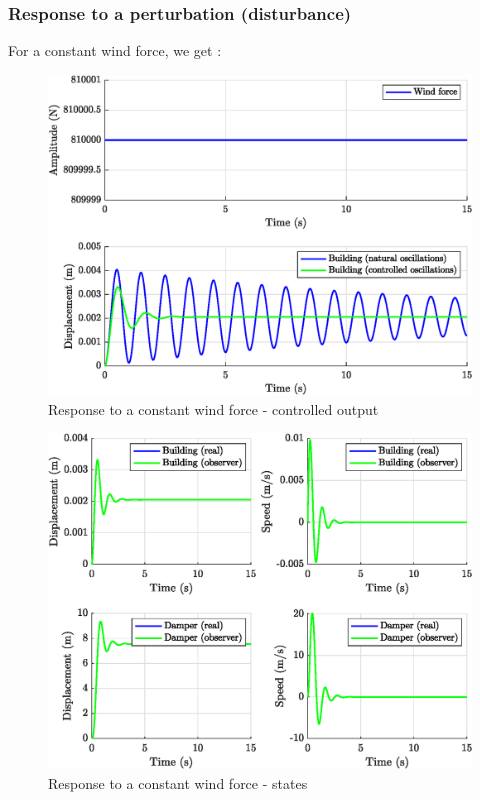 \subsubsection{Response to a perturbation (disturbance)}
For a constant wind force, we get : 
\begin{figure}[H]
    \centering
    \includegraphics[width=\textwidth]{resources/eps/constant-controller.eps}
    \caption{Response to a constant wind force - controlled output}
\end{figure}
\begin{figure}[H]
    \centering
    \includegraphics[width=\textwidth]{resources/eps/constant-observer.eps}
    \caption{Response to a constant wind force - states}
\end{figure}

